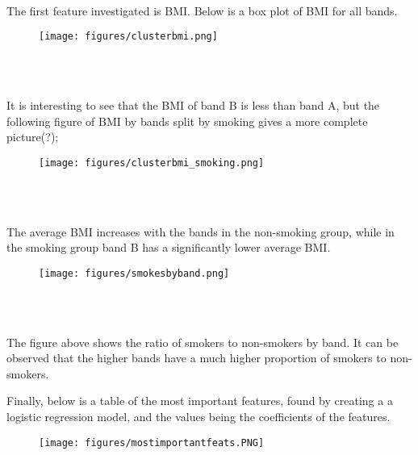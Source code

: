 \documentclass[12pt,twocolumn,letterpaper]{article}
\begin{document}
\paragraph{}
The first feature investigated is BMI. Below is a box plot of BMI for all bands.
\begin{figure}[H]
  \centering 
  \texttt{[image: figures/clusterbmi.png]}
    \caption{\\\\}
\end{figure} 

It is interesting to see that the BMI of band B is less than band A, but the following figure of BMI by bands split by smoking gives a more complete picture(?);

\begin{figure}[H]
  \centering
  \texttt{[image: figures/clusterbmi\_smoking.png]}
    \caption{\\\\}
\end{figure}

The average BMI increases with the bands in the non-smoking group, while in the smoking group band B has a significantly lower average BMI.

\begin{figure}[H]
  \centering
  \texttt{[image: figures/smokesbyband.png]}
    \caption{\\\\}
\end{figure}
The figure above shows the ratio of smokers to non-smokers by band. It can be observed that the higher bands have a much higher proportion of smokers to non-smokers.

Finally, below is a table of the most important features, found by creating a a logistic regression model, and the values being the coefficients of the features.

\begin{figure}[H]
  \centering
  \texttt{[image: figures/mostimportantfeats.PNG]}
    \caption{\\\\}
\end{figure} 
\end{document}
